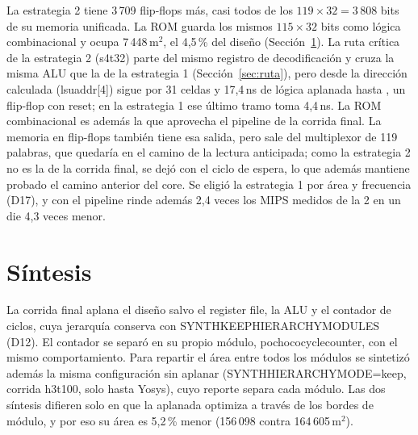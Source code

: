 \documentclass[11pt,a4paper]{article}
\DeclareRobustCommand{\sig}[1]{{\ttfamily\def\_{\textunderscore\allowbreak}#1}}
\newcommand{\umd}{\,\textmu m$^2$\xspace}
\begin{document}
La estrategia 2 tiene 3\,709 flip-flops más, casi todos de los $119 \times 32 = 3\,808$ bits de su memoria unificada. La ROM guarda los mismos $115 \times 32$ bits como lógica combinacional y ocupa 7\,448\umd, el 4,5\,\% del diseño (Sección~\ref{sec:sintesis}). La ruta crítica de la estrategia 2 (\sig{s4\_t32}) parte del mismo registro de decodificación y cruza la misma ALU que la de la estrategia 1 (Sección~\ref{sec:ruta}), pero desde la dirección calculada (\sig{lsu\_addr[4]}) sigue por 31 celdas y 17,4\,ns de lógica aplanada hasta \sig{\_33833\_}, un flip-flop con reset; en la estrategia 1 ese último tramo toma 4,4\,ns. La ROM combinacional es además la que aprovecha el pipeline de la corrida final. La memoria en flip-flops también tiene esa salida, pero sale del multiplexor de 119 palabras, que quedaría en el camino de la lectura anticipada; como la estrategia 2 no es la de la corrida final, se dejó con el ciclo de espera, lo que además mantiene probado el camino anterior del core. Se eligió la estrategia 1 por área y frecuencia (D17), y con el pipeline rinde además 2,4 veces los MIPS medidos de la 2 en un die 4,3 veces menor.

\section{Síntesis}
\label{sec:sintesis}

La corrida final aplana el diseño salvo el register file, la ALU y el contador de ciclos, cuya jerarquía conserva con \sig{SYNTH\_KEEP\_HIERARCHY\_MODULES} (D12). El contador se separó en su propio módulo, \sig{pochoco\_cycle\_counter}, con el mismo comportamiento. Para repartir el área entre todos los módulos se sintetizó además la misma configuración sin aplanar (\sig{SYNTH\_HIERARCHY\_MODE=keep}, corrida \sig{h3\_t100}, solo hasta Yosys), cuyo reporte separa cada módulo. Las dos síntesis difieren solo en que la aplanada optimiza a través de los bordes de módulo, y por eso su área es 5,2\,\% menor (156\,098 contra 164\,605\umd).
\end{document}
